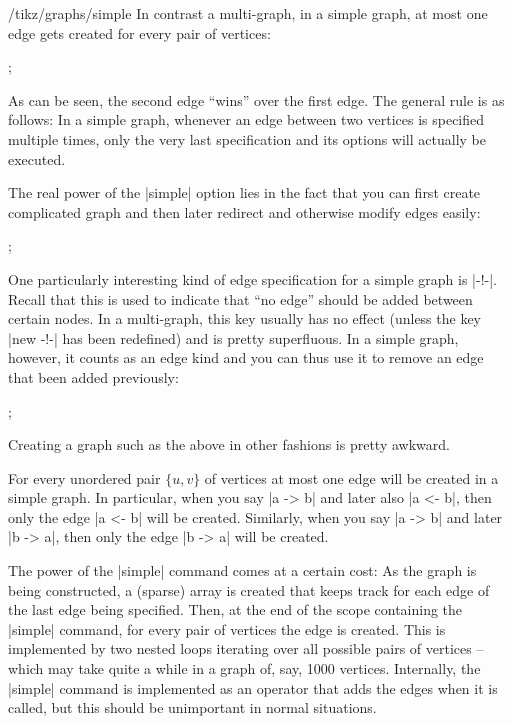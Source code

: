 \begin{key}{/tikz/graphs/simple}
  In contrast a multi-graph, in a simple graph, at most one edge gets
  created for every pair of vertices:
\begin{codeexample}[]
\tikz {};
\end{codeexample}
  As can be seen, the second edge ``wins'' over the first edge. The
  general rule is as follows: In a simple graph, whenever an edge
  between two vertices is specified multiple times, only the very last
  specification and its options will actually be executed.
  
  The real power of the |simple| option lies in the fact that you can
  first create complicated graph and then later redirect and otherwise
  modify edges easily: 

\begin{codeexample}[]
\tikz {};
\end{codeexample}

  One particularly interesting kind of edge specification for a simple
  graph is |-!-|. Recall that this is used to indicate that ``no
  edge'' should be added between certain nodes. In a multi-graph, this
  key usually has no effect (unless the key |new -!-| has been
  redefined) and is pretty superfluous. In a simple graph, however, it
  counts as an edge kind and you can thus use it to remove an edge
  that been added previously:

\begin{codeexample}[]
\tikz {};
\end{codeexample}

  Creating a graph such as the above in other fashions is pretty
  awkward.

  For every unordered pair $\{u,v\}$ of vertices at most one edge will
  be created in a simple graph. In particular, when you say |a -> b|
  and later also |a <- b|, then only the edge |a <- b| will be
  created. Similarly, when you say |a -> b| and later |b -> a|, then
  only the edge |b -> a| will be created. 

  The power of the |simple| command comes at a certain cost: As the
  graph is being constructed, a (sparse) array is created that keeps
  track for each edge of the last edge being specified. Then, at the
  end of the scope containing the |simple| command, for every pair of
  vertices the edge is created. This is implemented by two nested
  loops iterating over all possible pairs of vertices -- which may
  take quite a while in a graph of, say, 1000 vertices.
  Internally, the |simple| command is implemented as an operator that
  adds the edges when it is called, but
  this should be unimportant in normal situations.
\end{key}



